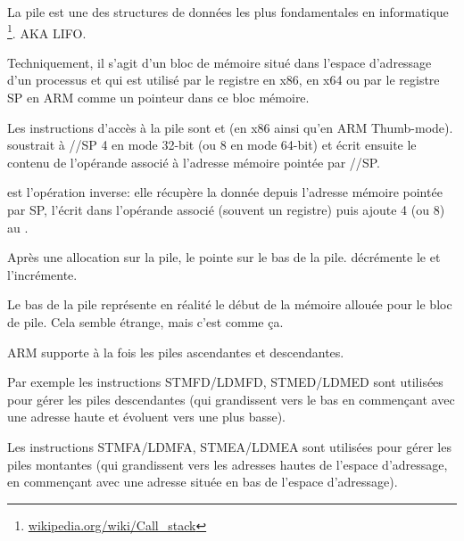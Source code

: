 \mysection{\Stack}
\label{sec:stack}
\myindex{\Stack}

La pile est une des structures de données les plus fondamentales en informatique
\footnote{\href{http://en.wikipedia.org/wiki/Call_stack}{wikipedia.org/wiki/Call\_stack}}.
\ac{AKA} \ac{LIFO}.

Techniquement, il s'agit d'un bloc de mémoire situé dans l'espace d'adressage
d'un processus et qui est utilisé par le registre \ESP en x86, \RSP en x64
ou par le registre \ac{SP} en ARM comme un pointeur dans ce bloc mémoire.

Les instructions d'accès à la pile sont \PUSH et \POP (en x86 ainsi qu'en ARM Thumb-mode).
\PUSH soustrait à \ESP/\RSP/\ac{SP} 4 en mode 32-bit (ou 8 en mode 64-bit) et écrit
ensuite le contenu de l'opérande associé à l'adresse mémoire pointée par \ESP/\RSP/\ac{SP}.

\POP est l'opération inverse: elle récupère la donnée depuis l'adresse mémoire pointée par \ac{SP},
l'écrit dans l'opérande associé (souvent un registre) puis ajoute 4 (ou 8) au .

Après une allocation sur la pile, le  pointe sur le bas de la pile.
\PUSH décrémente le  et \POP l'incrémente.

Le bas de la pile représente en réalité le début de la mémoire allouée pour
le bloc de pile. Cela semble étrange, mais c'est comme ça.

ARM supporte à la fois les piles ascendantes et descendantes.


Par exemple les instructions \ac{STMFD}/\ac{LDMFD}, \ac{STMED}/\ac{LDMED} sont utilisées pour gérer les piles
descendantes (qui grandissent vers le bas en commençant avec une adresse haute et évoluent vers une plus basse).

Les instructions \ac{STMFA}/\ac{LDMFA}, \ac{STMEA}/\ac{LDMEA} sont utilisées pour gérer les piles montantes
(qui grandissent vers les adresses hautes de l'espace d'adressage, en commençant
avec une adresse située en bas de l'espace d'adressage).

